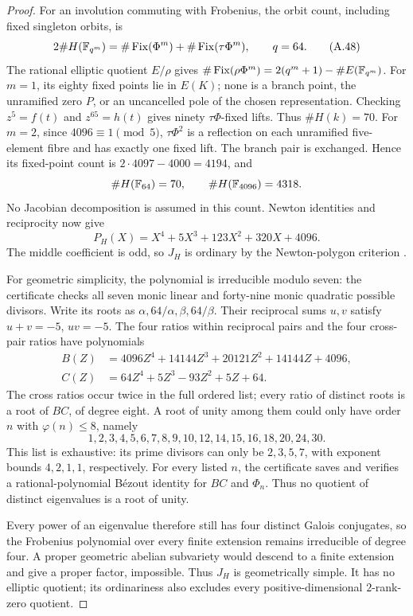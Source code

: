 \begin{proof}
For an involution commuting with Frobenius,
the orbit count, including fixed singleton orbits, is
\[
 2\#H(\mathbb F_{q^m})
   =\#\operatorname{Fix}(\Phi^m)
      +\#\operatorname{Fix}(\tau\Phi^m),\qquad q=64.       \tag{A.48}
\]
The rational elliptic quotient $E/\rho$ gives
$\#\operatorname{Fix}(\rho\Phi^m)
 =2(q^m+1)-\#E(\mathbb F_{q^m})$.
For $m=1$, its eighty fixed points lie in $E(K)$;
none is a branch point, the unramified zero $P$, or an
uncancelled pole of the chosen representation.
Checking
$z^5=f(t)$ and $z^{65}=h(t)$ gives ninety
$\tau\Phi$-fixed lifts. Thus $\#H(k)=70$.
For $m=2$, since $4096\equiv1\pmod5$,
$\tau\Phi^2$ is a reflection on each unramified
five-element fibre and has exactly one fixed lift.
The branch pair is exchanged. Hence its fixed-point
count is $2\cdot4097-4000=4194$, and
\[
 \#H(\mathbb F_{64})=70,\qquad \#H(\mathbb F_{4096})=4318.
\]
No Jacobian decomposition is assumed in this count.
Newton identities and reciprocity now give
\[
 P_H(X)=X^4+5X^3+123X^2+320X+4096.                      \tag{A.49}
\]
The middle coefficient is odd, so $J_H$ is ordinary
by the Newton-polygon criterion
\citep[Theorem 2.1 and its proof, p.~1172]
{A_vanBommelCostaLiPoonenSmith2025}.

For geometric simplicity, the polynomial is irreducible
modulo seven: the certificate checks all seven monic
linear and forty-nine monic quadratic possible divisors.
Write its roots as $\alpha,64/\alpha,\beta,64/\beta$.
Their reciprocal sums $u,v$ satisfy
$u+v=-5$, $uv=-5$. The four ratios within reciprocal
pairs and the four cross-pair ratios have polynomials
\[
\begin{aligned}
 B(Z)&=4096Z^4+14144Z^3+20121Z^2+14144Z+4096,\\
 C(Z)&=64Z^4+5Z^3-93Z^2+5Z+64.
\end{aligned}
\]
The cross ratios occur twice in the full ordered list;
every ratio of distinct roots is a root of $BC$, of
degree eight. A root of unity among them could only
have order $n$ with $\varphi(n)\le8$, namely
\[
 1,2,3,4,5,6,7,8,9,10,12,14,15,16,18,20,24,30.
\]
This list is exhaustive: its prime divisors can only
be $2,3,5,7$, with exponent bounds $4,2,1,1$,
respectively. For every listed $n$, the certificate
saves and verifies a rational-polynomial B\'ezout
identity for $BC$ and $\Phi_n$. Thus no quotient of
distinct eigenvalues is a root of unity.

Every power of an eigenvalue therefore still has
four distinct Galois conjugates, so the Frobenius
polynomial over every finite extension remains
irreducible of degree four. A proper geometric
abelian subvariety would descend to a finite
extension and give a proper factor, impossible.
Thus $J_H$ is geometrically simple. It has no
elliptic quotient; its ordinariness also excludes
every positive-dimensional $2$-rank-zero quotient.


\end{proof}
